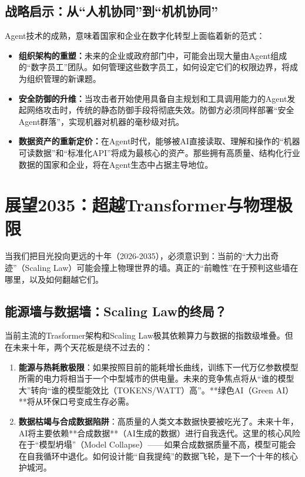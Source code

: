 \subsection{战略启示：从“人机协同”到“机机协同”}

Agent技术的成熟，意味着国家和企业在数字化转型上面临着新的范式：

\begin{itemize}
    \item \textbf{组织架构的重塑：}未来的企业或政府部门中，可能会出现大量由Agent组成的“数字员工”团队。如何管理这些数字员工，如何设定它们的权限边界，将成为组织管理的新课题。
    \item \textbf{安全防御的升维：}当攻击者开始使用具备自主规划和工具调用能力的Agent发起网络攻击时，传统的静态防御手段将彻底失效。防御方必须同样部署“安全Agent群落”，实现机器对机器的毫秒级对抗。
    \item \textbf{数据资产的重新定价：}在Agent时代，能够被AI直接读取、理解和操作的“机器可读数据”和“标准化API”将成为最核心的资产。那些拥有高质量、结构化行业数据的国家和企业，将在Agent生态中占据主导地位。
\end{itemize}

\section{展望2035：超越Transformer与物理极限}

当我们把目光投向更远的十年（2026-2035），必须意识到：当前的“大力出奇迹”（Scaling Law）可能会撞上物理世界的墙。真正的“前瞻性”在于预判这些墙在哪里，以及如何翻越它们。

\subsection{能源墙与数据墙：Scaling Law的终局？}

当前主流的Trasformer架构和Scaling Law极其依赖算力与数据的指数级堆叠。但在未来十年，两个天花板是绕不过去的：

\begin{enumerate}
    \item \textbf{能源与热耗散极限}：如果按照目前的能耗增长曲线，训练下一代万亿参数模型所需的电力将相当于一个中型城市的供电量。未来的竞争焦点将从“谁的模型大”转向“谁的模型能效比（TOKENS/WATT）高”。**绿色AI（Green AI）**将从环保口号变成生存必需。
    \item \textbf{数据枯竭与合成数据陷阱}：高质量的人类文本数据快要被吃光了。未来十年，AI将主要依赖**合成数据**（AI生成的数据）进行自我迭代。这里的核心风险在于“模型坍塌”（Model Collapse）——如果合成数据质量不高，模型可能会在自我循环中退化。如何设计能“自我提纯”的数据飞轮，是下一个十年的核心护城河。
\end{enumerate}


